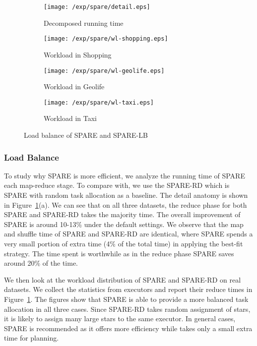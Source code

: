 \begin{figure}[h]
\centering
	\begin{subfigure}[b]{0.22\textwidth}
        \texttt{[image: /exp/spare/detail.eps]}
        \caption{Decomposed running time}
    \end{subfigure}
 	 \begin{subfigure}[b]{0.22\textwidth}
        \texttt{[image: /exp/spare/wl-shopping.eps]}
        \caption{Workload in Shopping}
    \end{subfigure}
    \begin{subfigure}[b]{0.22\textwidth}
        \texttt{[image: /exp/spare/wl-geolife.eps]}
        \caption{Workload in Geolife}
    \end{subfigure}  
    \begin{subfigure}[b]{0.22\textwidth}
        \texttt{[image: /exp/spare/wl-taxi.eps]}
        \caption{Workload in Taxi}
    \end{subfigure}
\caption{Load balance of SPARE and SPARE-LB}
\label{exp:wl}
\end{figure}

\subsubsection{Load Balance}
To study why SPARE is more efficient,
we analyze the running time of  SPARE
each map-reduce stage.  To compare with, we use
the SPARE-RD which is SPARE with random task allocation as a baseline.
The detail anatomy is shown in Figure~\ref{exp:wl}(a).
We can see that on all three datasets, the reduce phase for both SPARE and SPARE-RD takes the majority time. The overall improvement of SPARE is around 10-13\%
under the default settings. We observe that the map and shuffle time
of SPARE and SPARE-RD are identical, where SPARE spends a very small portion of extra time (4\% of the total time)
in applying the best-fit strategy. The time spent is worthwhile
as in the reduce phase SPARE saves around 20\% of the time. 

We then look at the workload distribution of SPARE and SPARE-RD on real datasets. 
We collect the statistics from executors
and report their reduce times in Figure~\ref{exp:wl}. 
The figures show that SPARE is able to provide a more balanced 
task allocation in all three cases. Since SPARE-RD takes random assignment
of stars, it is likely to assign many large stars to the same executor. 
In general cases, SPARE is recommended as 
it offers more efficiency while takes only a small extra time for planning.


